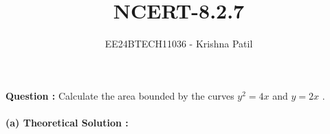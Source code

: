 \documentclass[journal]{IEEEtran}
\begin{document}

\vspace{3cm}

\title{NCERT-8.2.7}
\author{EE24BTECH11036 - Krishna Patil}
{\let\newpage\relax\maketitle}
\renewcommand{\thefigure}{\theenumi}
\renewcommand{\thetable}{\theenumi}
\setlength{\intextsep}{10pt} %

\textbf{Question : } Calculate the area bounded by the curves $y^2 = 4x$ and $y = 2x$ . \\
\solution \\
\textbf{(a) Theoretical Solution : }
\end{document}
